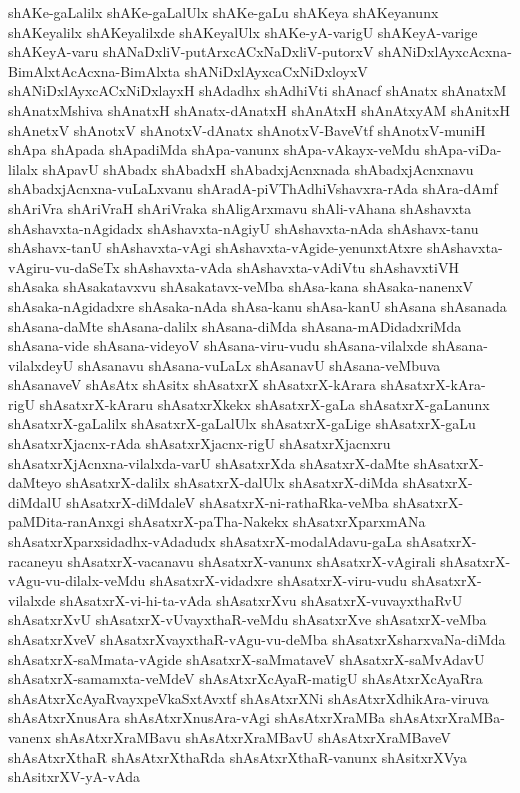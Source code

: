 {shAKe-gaLalilx
shAKe-gaLalUlx
shAKe-gaLu
shAKeya
shAKeyanunx
shAKeyalilx
shAKeyalilxde
shAKeyalUlx
shAKe-yA-varigU
shAKeyA-varige
shAKeyA-varu
shANaDxliV-putArxcACxNaDxliV-putorxV
shANiDxlAyxcAcxna-BimAlxtAcAcxna-BimAlxta
shANiDxlAyxcaCxNiDxloyxV
shANiDxlAyxcACxNiDxlayxH
shAdadhx
shAdhiVti
shAnacf
shAnatx
shAnatxM
shAnatxMshiva
shAnatxH
shAnatx-dAnatxH
shAnAtxH
shAnAtxyAM
shAnitxH
shAnetxV
shAnotxV
shAnotxV-dAnatx
shAnotxV-BaveVtf
shAnotxV-muniH
shApa
shApada
shApadiMda
shApa-vanunx
shApa-vAkayx-veMdu
shApa-viDa-lilalx
shApavU
shAbadx
shAbadxH
shAbadxjAcnxnada
shAbadxjAcnxnavu
shAbadxjAcnxna-vuLaLxvanu
shAradA-piVThAdhiVshavxra-rAda
shAra-dAmf
shAriVra
shAriVraH
shAriVraka
shAligArxmavu
shAli-vAhana
shAshavxta
shAshavxta-nAgidadx
shAshavxta-nAgiyU
shAshavxta-nAda
shAshavx-tanu
shAshavx-tanU
shAshavxta-vAgi
shAshavxta-vAgide-yenunxtAtxre
shAshavxta-vAgiru-vu-daSeTx
shAshavxta-vAda
shAshavxta-vAdiVtu
shAshavxtiVH
shAsaka
shAsakatavxvu
shAsakatavx-veMba
shAsa-kana
shAsaka-nanenxV
shAsaka-nAgidadxre
shAsaka-nAda
shAsa-kanu
shAsa-kanU
shAsana
shAsanada
shAsana-daMte
shAsana-dalilx
shAsana-diMda
shAsana-mADidadxriMda
shAsana-vide
shAsana-videyoV
shAsana-viru-vudu
shAsana-vilalxde
shAsana-vilalxdeyU
shAsanavu
shAsana-vuLaLx
shAsanavU
shAsana-veMbuva
shAsanaveV
shAsAtx
shAsitx
shAsatxrX
shAsatxrX-kArara
shAsatxrX-kAra-rigU
shAsatxrX-kAraru
shAsatxrXkekx
shAsatxrX-gaLa
shAsatxrX-gaLanunx
shAsatxrX-gaLalilx
shAsatxrX-gaLalUlx
shAsatxrX-gaLige
shAsatxrX-gaLu
shAsatxrXjacnx-rAda
shAsatxrXjacnx-rigU
shAsatxrXjacnxru
shAsatxrXjAcnxna-vilalxda-varU
shAsatxrXda
shAsatxrX-daMte
shAsatxrX-daMteyo
shAsatxrX-dalilx
shAsatxrX-dalUlx
shAsatxrX-diMda
shAsatxrX-diMdalU
shAsatxrX-diMdaleV
shAsatxrX-ni-rathaRka-veMba
shAsatxrX-paMDita-ranAnxgi
shAsatxrX-paTha-Nakekx
shAsatxrXparxmANa
shAsatxrXparxsidadhx-vAdadudx
shAsatxrX-modalAdavu-gaLa
shAsatxrX-racaneyu
shAsatxrX-vacanavu
shAsatxrX-vanunx
shAsatxrX-vAgirali
shAsatxrX-vAgu-vu-dilalx-veMdu
shAsatxrX-vidadxre
shAsatxrX-viru-vudu
shAsatxrX-vilalxde
shAsatxrX-vi-hi-ta-vAda
shAsatxrXvu
shAsatxrX-vuvayxthaRvU
shAsatxrXvU
shAsatxrX-vUvayxthaR-veMdu
shAsatxrXve
shAsatxrX-veMba
shAsatxrXveV
shAsatxrXvayxthaR-vAgu-vu-deMba
shAsatxrXsharxvaNa-diMda
shAsatxrX-saMmata-vAgide
shAsatxrX-saMmataveV
shAsatxrX-saMvAdavU
shAsatxrX-samamxta-veMdeV
shAsAtxrXcAyaR-matigU
shAsAtxrXcAyaRra
shAsAtxrXcAyaRvayxpeVkaSxtAvxtf
shAsAtxrXNi
shAsAtxrXdhikAra-viruva
shAsAtxrXnusAra
shAsAtxrXnusAra-vAgi
shAsAtxrXraMBa
shAsAtxrXraMBa-vanenx
shAsAtxrXraMBavu
shAsAtxrXraMBavU
shAsAtxrXraMBaveV
shAsAtxrXthaR
shAsAtxrXthaRda
shAsAtxrXthaR-vanunx
shAsitxrXVya
shAsitxrXV-yA-vAda
}
